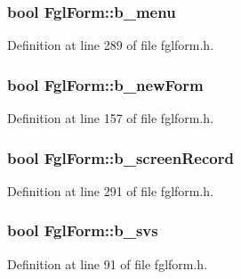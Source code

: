 \hypertarget{classFglForm_ac1f8bea18516701b1192825f83e962d7}{
\subsubsection[{b\_\-menu}]{\setlength{\rightskip}{0pt plus 5cm}bool {\bf FglForm::b\_\-menu}}}
\label{classFglForm_ac1f8bea18516701b1192825f83e962d7}


Definition at line 289 of file fglform.h.

\hypertarget{classFglForm_ab089d04abad8973c262e3c5e1827b070}{
\subsubsection[{b\_\-newForm}]{\setlength{\rightskip}{0pt plus 5cm}bool {\bf FglForm::b\_\-newForm}}}
\label{classFglForm_ab089d04abad8973c262e3c5e1827b070}


Definition at line 157 of file fglform.h.

\hypertarget{classFglForm_a656061ca98f40226c99fa61b12ced56c}{
\subsubsection[{b\_\-screenRecord}]{\setlength{\rightskip}{0pt plus 5cm}bool {\bf FglForm::b\_\-screenRecord}}}
\label{classFglForm_a656061ca98f40226c99fa61b12ced56c}


Definition at line 291 of file fglform.h.

\hypertarget{classFglForm_a8c411d93b67981a684a5cf6b67111dc1}{
\subsubsection[{b\_\-svs}]{\setlength{\rightskip}{0pt plus 5cm}bool {\bf FglForm::b\_\-svs}}}
\label{classFglForm_a8c411d93b67981a684a5cf6b67111dc1}


Definition at line 91 of file fglform.h.

